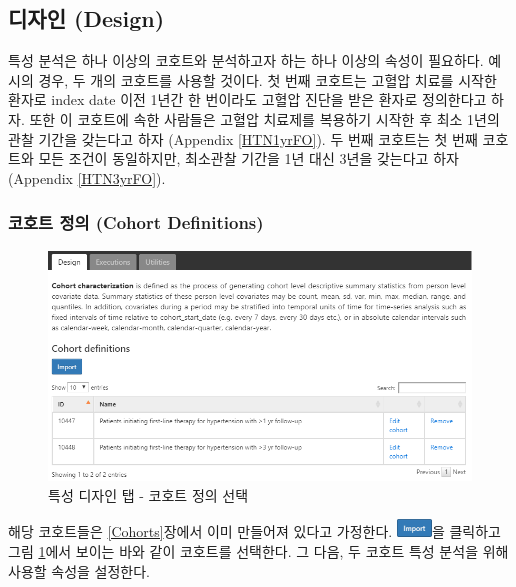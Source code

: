 \documentclass[11pt]{book}
\theoremstyle{definition}
\theoremstyle{definition}
\theoremstyle{definition}
\theoremstyle{remark}
\begin{document}
\subsection{디자인 (Design)}\label{-design}

특성 분석은 하나 이상의 코호트와 분석하고자 하는 하나 이상의 속성이
필요하다. 예시의 경우, 두 개의 코호트를 사용할 것이다. 첫 번째 코호트는
고혈압 치료를 시작한 환자로 index date 이전 1년간 한 번이라도 고혈압
진단을 받은 환자로 정의한다고 하자. 또한 이 코호트에 속한 사람들은
고혈압 치료제를 복용하기 시작한 후 최소 1년의 관찰 기간을 갖는다고 하자
(Appendix \ref{HTN1yrFO}). 두 번째 코호트는 첫 번째 코호트와 모든 조건이
동일하지만, 최소관찰 기간을 1년 대신 3년을 갖는다고 하자 (Appendix
\ref{HTN3yrFO}).

\subsubsection*{코호트 정의 (Cohort
Definitions)}\label{--cohort-definitions}

\begin{figure}

{\centering \includegraphics[width=1\linewidth]{images/Characterization/atlasCharacterizationCohortSelection} 

}

\caption{특성 디자인 탭 - 코호트 정의 선택}\label{fig:atlasCharacterizationCohortSelection}
\end{figure}

해당 코호트들은 \ref{Cohorts}장에서 이미 만들어져 있다고 가정한다.
\includegraphics{images/Characterization/atlasImportButton.png}을
클릭하고 그림 \ref{fig:atlasCharacterizationCohortSelection}에서 보이는
바와 같이 코호트를 선택한다. 그 다음, 두 코호트 특성 분석을 위해 사용할
속성을 설정한다.
\end{document}
